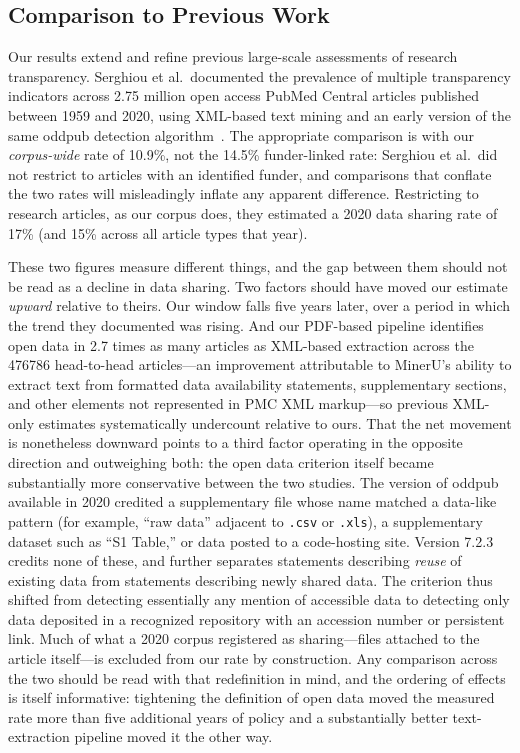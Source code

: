 \subsection{Comparison to Previous Work}

Our results extend and refine previous large-scale assessments of research transparency. Serghiou et al.\ documented the prevalence of multiple transparency indicators across 2.75 million open access PubMed Central articles published between 1959 and 2020, using XML-based text mining and an early version of the same oddpub detection algorithm~\cite{Serghiou2021-pl}. The appropriate comparison is with our \emph{corpus-wide} rate of 10.9\%, not the 14.5\% funder-linked rate: Serghiou et al.\ did not restrict to articles with an identified funder, and comparisons that conflate the two rates will misleadingly inflate any apparent difference. Restricting to research articles, as our corpus does, they estimated a 2020 data sharing rate of 17\% (and 15\% across all article types that year).

These two figures measure different things, and the gap between them should not be read as a decline in data sharing. Two factors should have moved our estimate \emph{upward} relative to theirs. Our window falls five years later, over a period in which the trend they documented was rising. And our PDF-based pipeline identifies open data in 2.7 times as many articles as XML-based extraction across the \num{476786} head-to-head articles---an improvement attributable to MinerU's ability to extract text from formatted data availability statements, supplementary sections, and other elements not represented in PMC XML markup---so previous XML-only estimates systematically undercount relative to ours. That the net movement is nonetheless downward points to a third factor operating in the opposite direction and outweighing both: the open data criterion itself became substantially more conservative between the two studies. The version of oddpub available in 2020 credited a supplementary file whose name matched a data-like pattern (for example, ``raw data'' adjacent to \texttt{.csv} or \texttt{.xls}), a supplementary dataset such as ``S1 Table,'' or data posted to a code-hosting site. Version 7.2.3 credits none of these, and further separates statements describing \emph{reuse} of existing data from statements describing newly shared data. The criterion thus shifted from detecting essentially any mention of accessible data to detecting only data deposited in a recognized repository with an accession number or persistent link. Much of what a 2020 corpus registered as sharing---files attached to the article itself---is excluded from our rate by construction. Any comparison across the two should be read with that redefinition in mind, and the ordering of effects is itself informative: tightening the definition of open data moved the measured rate more than five additional years of policy and a substantially better text-extraction pipeline moved it the other way.

